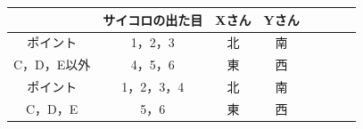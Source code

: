 \documentclass[border=1pt]{standalone}
\begin{document}
    \begin{tabular}{|Sc|Sc|Sc|Sc|}
         & サイコロの出た目 & Xさん & Yさん \\
        \hline
        ポイント & 1，2，3 & 北 & 南 \\
        C，D，E以外 & 4，5，6 & 東 & 西 \\
        \hline
        ポイント & 1，2，3，4 & 北 & 南 \\
        C，D，E & 5，6 & 東 & 西 \\
        \hline
    \end{tabular}
\end{document}
